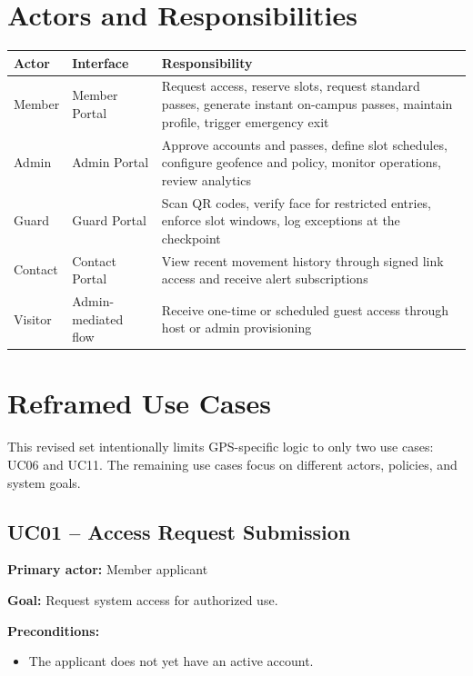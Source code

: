 \documentclass[12pt,letterpaper]{article}
\begin{document}
\section{Actors and Responsibilities}

\begin{tabularx}{\textwidth}{@{}L{2cm}L{2.8cm}Y@{}}
\toprule
\textbf{Actor} & \textbf{Interface} & \textbf{Responsibility} \\
\midrule
Member & Member Portal & Request access, reserve slots, request standard passes, generate instant on-campus passes, maintain profile, trigger emergency exit \\
Admin & Admin Portal & Approve accounts and passes, define slot schedules, configure geofence and policy, monitor operations, review analytics \\
Guard & Guard Portal & Scan QR codes, verify face for restricted entries, enforce slot windows, log exceptions at the checkpoint \\
Contact & Contact Portal & View recent movement history through signed link access and receive alert subscriptions \\
Visitor & Admin-mediated flow & Receive one-time or scheduled guest access through host or admin provisioning \\
\bottomrule
\end{tabularx}

\section{Reframed Use Cases}

This revised set intentionally limits GPS-specific logic to only two use cases: UC06 and UC11. The remaining use cases focus on different actors, policies, and system goals.

\subsection{UC01 -- Access Request Submission}
\textbf{Primary actor:} Member applicant

\textbf{Goal:} Request system access for authorized use.

\textbf{Preconditions:}
\begin{itemize}
    \item The applicant does not yet have an active account.
\end{itemize}
\end{document}

